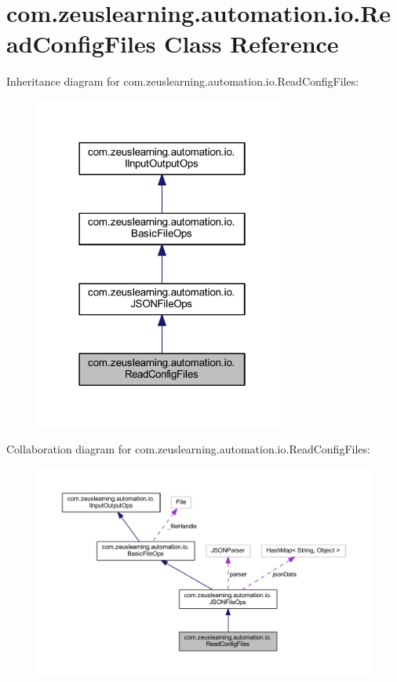 \hypertarget{classcom_1_1zeuslearning_1_1automation_1_1io_1_1ReadConfigFiles}{}\section{com.\+zeuslearning.\+automation.\+io.\+Read\+Config\+Files Class Reference}
\label{classcom_1_1zeuslearning_1_1automation_1_1io_1_1ReadConfigFiles}


Inheritance diagram for com.\+zeuslearning.\+automation.\+io.\+Read\+Config\+Files\+:\nopagebreak
\begin{figure}[H]
\begin{center}
\leavevmode
\includegraphics[width=238pt]{dd/d4b/classcom_1_1zeuslearning_1_1automation_1_1io_1_1ReadConfigFiles__inherit__graph}
\end{center}
\end{figure}


Collaboration diagram for com.\+zeuslearning.\+automation.\+io.\+Read\+Config\+Files\+:\nopagebreak
\begin{figure}[H]
\begin{center}
\leavevmode
\includegraphics[width=350pt]{d2/da8/classcom_1_1zeuslearning_1_1automation_1_1io_1_1ReadConfigFiles__coll__graph}
\end{center}
\end{figure}
